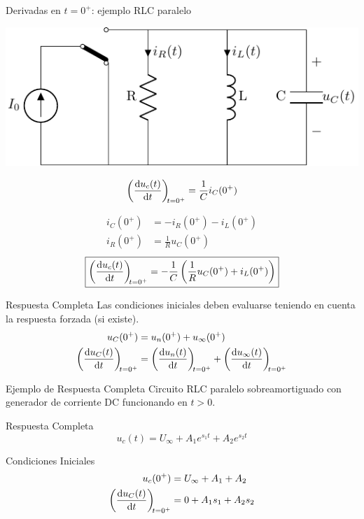 \documentclass[aspectratio=169, usenames,svgnames,dvipsnames]{beamer}
\begin{document}
\begin{frame}[label={sec:orgaf93375}]{Derivadas en \(t = 0^+\): ejemplo RLC paralelo}
\begin{center}
\includegraphics[height=0.25\textheight]{figs/transitorio_circuitoRLC_paralelo_t0+.pdf}
\end{center}

\[
  \diff{u_c(t)}{t}[t = 0^+] = \frac{1}{C}i_C(0^+)
\]

\begin{align*}
  i_C(0^+) &= -i_R(0^+) - i_L(0^+)\\
  i_R(0^+) &= \frac{1}{R} u_C(0^+)
\end{align*}
\[
  \boxed{\diff{u_c(t)}{t}[t = 0^+] = - \frac{1}{C} \left( \frac{1}{R} u_C(0^+) +  i_L(0^+)\right)}
\]
\end{frame}


\begin{frame}[label={sec:org9770cba}]{Respuesta Completa}
Las condiciones iniciales deben evaluarse teniendo en cuenta la respuesta forzada (si existe).
\begin{align*}
  u_C(0^+) &= u_n(0^+) + u_{\infty}(0^+)\\
  \diff{u_C(t)}{t}[t = 0^+] &= \diff{u_n(t)}{t}[t = 0^+] + \diff{u_{\infty}(t)}{t}[t = 0^+]  
\end{align*}
\end{frame}

\begin{frame}[label={sec:orge2d0095}]{Ejemplo de Respuesta Completa}
Circuito RLC paralelo sobreamortiguado con generador de corriente DC funcionando en \(t > 0\). 

\begin{block}{Respuesta Completa}
\[
  u_c(t) = U_{\infty} + A_1 e^{s_1 t} + A_2 e^{s_2 t}
\]
\end{block}

\begin{block}{Condiciones Iniciales}
\begin{align*}
u_c(0^+) &= U_\infty + A_1 + A_2\\
\diff{u_C(t)}{t}[t = 0^+] &= 0 + A_1 s_1 + A_2 s_2
\end{align*}
\end{block}
\end{frame}
\end{document}

